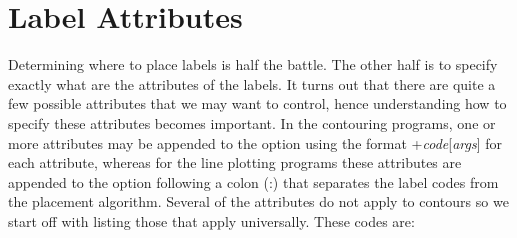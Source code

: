\section{Label Attributes}
Determining where to place labels is half the battle.  The other half is to specify exactly
what are the attributes of the labels.  It turns out that there are quite a few possible
attributes that we may want to control, hence understanding how to specify these attributes
becomes important.  In the contouring programs, one or more attributes may be appended to the
 option using the format +\emph{code}[\emph{args}] for each attribute, whereas for the line
plotting programs these attributes are appended to the  option following a colon (:)
that separates the label codes from the placement algorithm.  Several of the attributes do not
apply to contours so we start off with listing those that apply universally.  These codes are:
